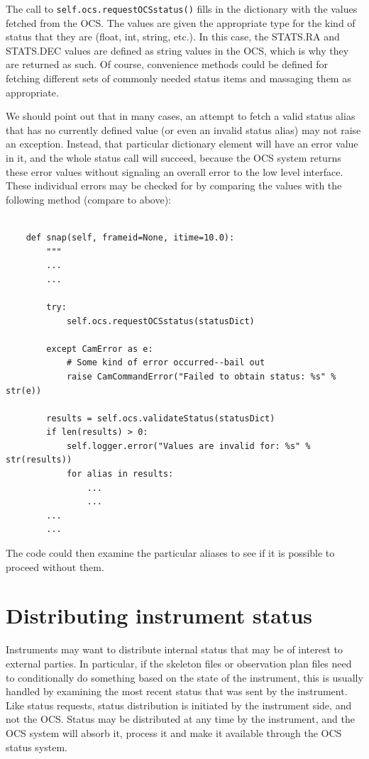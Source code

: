 \documentclass[11pt]{report}
\begin{document}
The call to {\tt self.ocs.requestOCSstatus()} fills in the dictionary with the
values fetched from the OCS. The values are given the appropriate type
for the kind of status that they are (float, int, string, etc.). In this
case, the STATS.RA and STATS.DEC values are defined as string values in
the OCS, which is why they are returned as such. Of course, convenience
methods could be defined for fetching different sets of commonly needed
status items and massaging them as appropriate. 

We should point out that in many cases, an attempt to fetch a valid
status alias that has no currently defined value (or even an invalid
status alias) may not raise an exception. Instead, that particular
dictionary element will have an error value in it, and the whole status
call will succeed, because the OCS system returns these error values
without signaling an overall error to the low level interface. These
individual errors may be checked for by comparing the values with the
following method (compare to above): 
\begin{verbatim}

    def snap(self, frameid=None, itime=10.0):
        """
        ...
        ...

        try:
            self.ocs.requestOCSstatus(statusDict)

        except CamError as e:
            # Some kind of error occurred--bail out
            raise CamCommandError("Failed to obtain status: %s" % str(e))

        results = self.ocs.validateStatus(statusDict)
        if len(results) > 0:
            self.logger.error("Values are invalid for: %s" % str(results))
            for alias in results:
                ...
                ...
        ...
        ...

\end{verbatim}
The code could then examine the particular aliases to see if it is
possible to proceed without them. 

\section{Distributing instrument status}
Instruments may want to distribute internal status that may be of
interest to external parties. In particular, if the skeleton files or
observation plan files need to conditionally do something based on the
state of the instrument, this is usually handled by examining the most
recent status that was sent by the instrument. Like status requests,
status distribution is initiated by the instrument side, and not the
OCS. Status may be distributed at any time by the instrument, and the
OCS system will absorb it, process it and make it available through the
OCS status system. 
\end{document}
